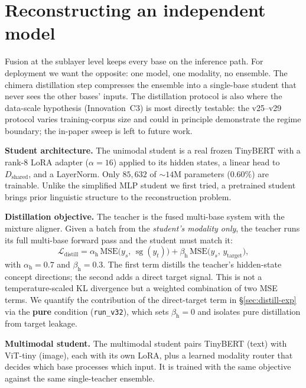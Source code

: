 \documentclass[10pt,twoside]{article}
\newcommand{\stopgrad}{\operatorname{sg}}
\theoremstyle{definition}
\begin{document}
\section{Reconstructing an independent model}
\label{sec:distill}

Fusion at the sublayer level keeps every base on the inference path. For deployment we want the opposite: one model, one modality, no ensemble. The chimera distillation step compresses the ensemble into a single-base student that never sees the other bases' inputs. The distillation protocol is also where the data-scale hypothesis (Innovation~C3) is most directly testable: the v25--v29 protocol varies training-corpus size and could in principle demonstrate the regime boundary; the in-paper sweep is left to future work.

\textbf{Student architecture.} The unimodal student is a real frozen TinyBERT \citep{jiao2020} with a rank-8 LoRA adapter ($\alpha{=}16$) applied to its hidden states, a linear head to $D_{\text{shared}}$, and a LayerNorm. Only $85{,}632$ of ${\sim}14$M parameters ($0.60\%$) are trainable. Unlike the simplified MLP student we first tried, a pretrained student brings prior linguistic structure to the reconstruction problem.

\textbf{Distillation objective.} The teacher is the fused multi-base system with the mixture aligner. Given a batch from the \emph{student's modality only}, the teacher runs its full multi-base forward pass and the student must match it:
\begin{equation}
\label{eq:distill}
\mathcal{L}_{\text{distill}} = \alpha_{\text{h}} \, \mathrm{MSE}\big(y_s,\, \stopgrad(y_t)\big) + \beta_{\text{h}} \, \mathrm{MSE}\big(y_s,\, y_{\text{target}}\big),
\end{equation}
with $\alpha_{\text{h}} = 0.7$ and $\beta_{\text{h}} = 0.3$. The first term distills the teacher's hidden-state concept directions; the second adds a direct target signal. This is not a temperature-scaled KL divergence but a weighted combination of two MSE terms. We quantify the contribution of the direct-target term in \S\ref{sec:distill-exp} via the \textbf{pure} condition (\texttt{run\_v32}), which sets $\beta_{\text{h}}=0$ and isolates pure distillation from target leakage.

\textbf{Multimodal student.} The multimodal student pairs TinyBERT (text) with ViT-tiny (image), each with its own LoRA, plus a learned modality router that decides which base processes which input. It is trained with the same objective against the same single-teacher ensemble.
\end{document}
